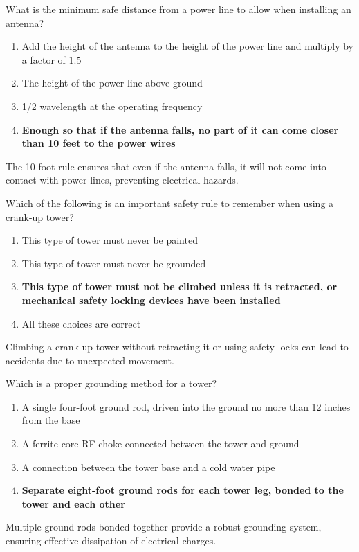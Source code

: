
\begin{tcolorbox}[colback=gray!10!white,colframe=black!75!black,title={T0B06}]
What is the minimum safe distance from a power line to allow when installing an antenna?
\begin{enumerate}[label=\Alph*),noitemsep]
    \item Add the height of the antenna to the height of the power line and multiply by a factor of 1.5
    \item The height of the power line above ground
    \item 1/2 wavelength at the operating frequency
    \item \textbf{Enough so that if the antenna falls, no part of it can come closer than 10 feet to the power wires}
\end{enumerate}
\end{tcolorbox}
The 10-foot rule ensures that even if the antenna falls, it will not come into contact with power lines, preventing electrical hazards.


\begin{tcolorbox}[colback=gray!10!white,colframe=black!75!black,title={T0B07}]
Which of the following is an important safety rule to remember when using a crank-up tower?
\begin{enumerate}[label=\Alph*),noitemsep]
    \item This type of tower must never be painted
    \item This type of tower must never be grounded
    \item \textbf{This type of tower must not be climbed unless it is retracted, or mechanical safety locking devices have been installed}
    \item All these choices are correct
\end{enumerate}
\end{tcolorbox}
Climbing a crank-up tower without retracting it or using safety locks can lead to accidents due to unexpected movement.


\begin{tcolorbox}[colback=gray!10!white,colframe=black!75!black,title={T0B08}]
Which is a proper grounding method for a tower?
\begin{enumerate}[label=\Alph*),noitemsep]
    \item A single four-foot ground rod, driven into the ground no more than 12 inches from the base
    \item A ferrite-core RF choke connected between the tower and ground
    \item A connection between the tower base and a cold water pipe
    \item \textbf{Separate eight-foot ground rods for each tower leg, bonded to the tower and each other}
\end{enumerate}
\end{tcolorbox}
Multiple ground rods bonded together provide a robust grounding system, ensuring effective dissipation of electrical charges.

